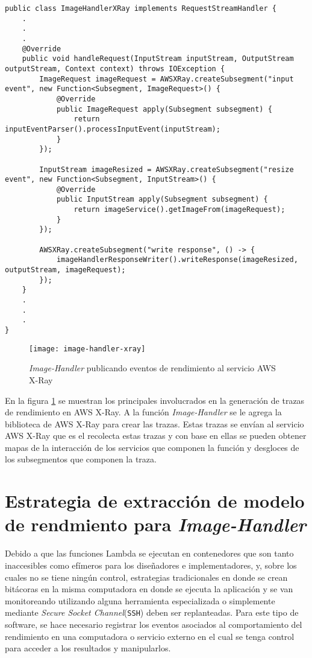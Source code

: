 \begin{lstlisting}[caption={Extracto de la clase \texttt{ImageHandler.java} instrumentalizada con AWS X-Ray}, label={lst:image-handler-xray}]
public class ImageHandlerXRay implements RequestStreamHandler {
    .
    .
    .
    @Override
    public void handleRequest(InputStream inputStream, OutputStream outputStream, Context context) throws IOException {
        ImageRequest imageRequest = AWSXRay.createSubsegment("input event", new Function<Subsegment, ImageRequest>() {
            @Override
            public ImageRequest apply(Subsegment subsegment) {
                return inputEventParser().processInputEvent(inputStream);
            }
        });

        InputStream imageResized = AWSXRay.createSubsegment("resize event", new Function<Subsegment, InputStream>() {
            @Override
            public InputStream apply(Subsegment subsegment) {
                return imageService().getImageFrom(imageRequest);
            }
        });

        AWSXRay.createSubsegment("write response", () -> {
            imageHandlerResponseWriter().writeResponse(imageResized, outputStream, imageRequest);
        });
    }
    .
    .
    .
}
\end{lstlisting}


\begin{figure}[h]
  \centering
  \texttt{[image: image-handler-xray]}
  \caption{\emph{Image-Handler} publicando eventos de rendimiento al servicio AWS X-Ray}
  \label{fig:image-handler-xray}
\end{figure}

En la figura \ref{fig:image-handler-xray} se muestran los principales involucrados en la generación de trazas de rendimiento en AWS X-Ray. A la función \emph{Image-Handler} se le agrega la biblioteca de AWS X-Ray para crear las trazas. Estas trazas se envían al servicio AWS X-Ray que es el recolecta estas trazas y con base en ellas se pueden obtener mapas de la interacción de los servicios que componen la función y desgloces de los subsegmentos que componen la traza.


\section{Estrategia de extracción de modelo de rendmiento para \emph{Image-Handler}} \label{sec:estrategia-de-extraccion-de-modelo}
 
Debido a que las funciones Lambda se ejecutan en contenedores que son tanto inaccesibles como efímeros para los diseñadores e implementadores, y, sobre los cuales no se tiene ningún control, estrategias tradicionales en donde se crean bitácoras en la misma computadora en donde se ejecuta la aplicación y se van monitoreando utilizando alguna herramienta especializada o simplemente mediante \emph{Secure Socket Channel}(\texttt{SSH}) deben ser replanteadas. Para este tipo de software, se hace necesario registrar los eventos asociados al comportamiento del rendimiento en una computadora o servicio externo en el cual se tenga control para acceder a los resultados y manipularlos.

